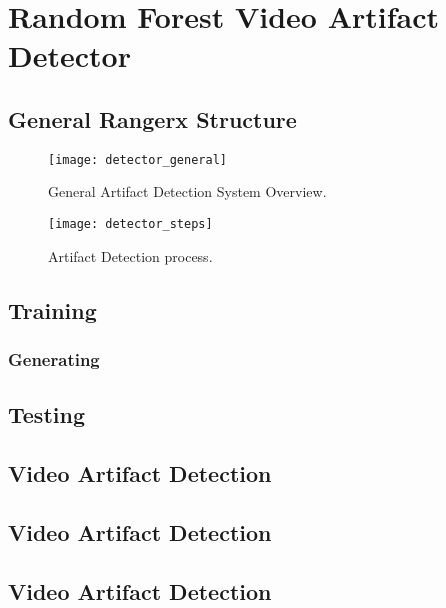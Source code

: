 \chapter{Random Forest Video Artifact Detector }
\label{ch:solucion}

\section{General Rangerx Structure}
\label{sec:sol_struct}

\begin{figure} [!h]
  \centering
  
  \texttt{[image: detector\_general]}
  
  \caption{General Artifact Detection System Overview. }
  \label{fig:detector_overview}

\end{figure}

\begin{figure} [!h]
  \centering
  
  \texttt{[image: detector\_steps]}
  
  \caption{Artifact Detection process. }
  \label{fig:detector_steps}

\end{figure}



\section{Training}
\label{sec:sol_}

\subsection{Generating }
\label{sec:intro_problem}

\section{Testing}
\label{sec:intro_problem}

\section{Video Artifact Detection}
\label{sec:intro_problem}

\section{Video Artifact Detection}
\label{sec:intro_problem}

\section{Video Artifact Detection}
\label{sec:intro_problem}

